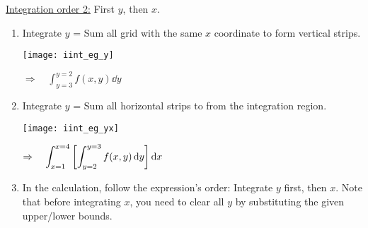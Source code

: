 \documentclass[class=article, crop=false, 12pt]{standalone}
\begin{document}
\begin{example}
    \ul{Integration order 2:} First $y$, then $x$.
    \begin{enumerate}
        \item Integrate $y$ = Sum all grid with the same $x$ coordinate to form vertical strips.
        
        \begin{center}
            \begin{minipage}{0.35\textwidth}
                \centering
                \texttt{[image: iint\_eg\_y]}
            \end{minipage}
            $\displaystyle \Rightarrow \quad  \int_{y=3}^{y=2}f(x,y)\dd{y}$
        \end{center}

        
        \item Integrate $y$ = Sum all horizontal strips to from the integration region.
        
        \begin{center}
            \begin{minipage}{0.55\textwidth}
                \centering
                \texttt{[image: iint\_eg\_yx]}
            \end{minipage}
            $\displaystyle \Rightarrow \quad  \int_{x=1}^{x=4}\qty[\int_{y=2}^{y=3}f(x,y)\dd{y}]\dd{x}$
        \end{center}

        \newpage
        \item In the calculation, follow the expression's order: Integrate $y$ first, then $x$. 
        Note that before integrating $x$, you need to clear all $y$ by substituting the given upper/lower bounds.
    \end{enumerate}

\end{example}
\end{document}
